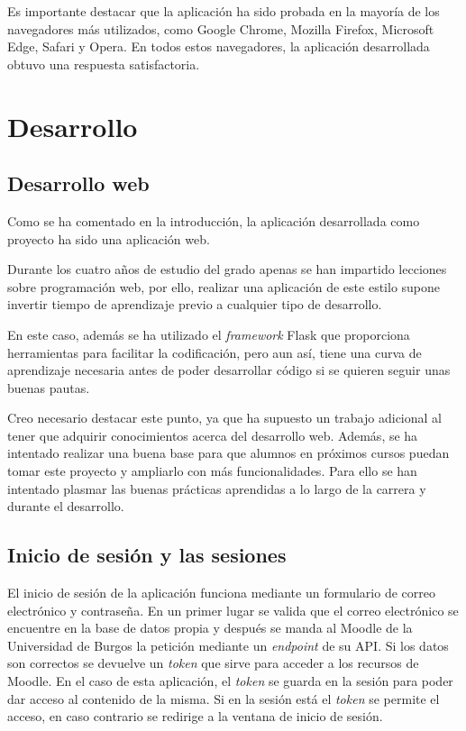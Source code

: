 Es importante destacar que la aplicación ha sido probada en la mayoría de los navegadores más utilizados, como Google Chrome, Mozilla Firefox, Microsoft Edge, Safari y Opera. En todos estos navegadores, la aplicación desarrollada obtuvo una respuesta satisfactoria.

\section{Desarrollo}
\subsection{Desarrollo web}
Como se ha comentado en la introducción, la aplicación desarrollada como proyecto ha sido una aplicación web.

Durante los cuatro años de estudio del grado apenas se han impartido lecciones sobre programación web, por ello, realizar una aplicación de este estilo supone invertir tiempo de aprendizaje previo a cualquier tipo de desarrollo.

En este caso, además se ha utilizado el \textit{framework} Flask que proporciona herramientas para facilitar la codificación, pero aun así, tiene una curva de aprendizaje necesaria antes de poder desarrollar código si se quieren seguir unas buenas pautas.

Creo necesario destacar este punto, ya que ha supuesto un trabajo adicional al tener que adquirir conocimientos acerca del desarrollo web.
Además, se ha intentado realizar una buena base para que alumnos en próximos cursos puedan tomar este proyecto y ampliarlo con más funcionalidades.
Para ello se han intentado plasmar las buenas prácticas aprendidas a lo largo de la carrera y durante el desarrollo.

\subsection{Inicio de sesión y las sesiones}
El inicio de sesión de la aplicación funciona mediante un formulario de correo electrónico y contraseña.
En un primer lugar se valida que el correo electrónico se encuentre en la base de datos propia y después se manda al Moodle de la Universidad de Burgos la petición mediante un \textit{endpoint} de su API. 
Si los datos son correctos se devuelve un \textit{token} que sirve para acceder a los recursos de Moodle.
En el caso de esta aplicación, el \textit{token} se guarda en la sesión para poder dar acceso al contenido de la misma.
Si en la sesión está el \textit{token} se permite el acceso, en caso contrario se redirige a la ventana de inicio de sesión.

